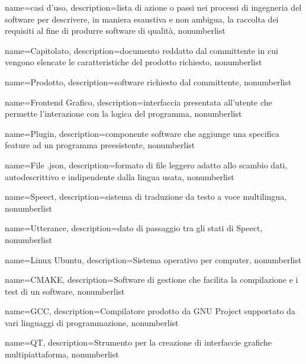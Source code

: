 {
	name={casi d'uso},
	description={lista di azione o passi nei processi di ingegneria del software per descrivere, in maniera esaustiva e non ambigua, la raccolta dei requisiti al fine di produrre software di qualità},
	nonumberlist
}


{
	name={Capitolato},
	description={documento reddatto dal committente in cui vengono elencate le caratteristiche del prodotto richiesto},
	nonumberlist
}

{
	name={Prodotto},
	description={software richiesto dal committente},
	nonumberlist
}

{
	name={Frontend Grafico},
	description={interfaccia presentata all'utente che permette l'interazione con la logica del programma},
	nonumberlist
}

{
	name={Plugin},
	description={componente software che aggiunge una specifica feature ad un programma preesistente},
	nonumberlist
}

{
	name={File .json},
	description={formato di file leggero adatto allo scambio dati, autodescrittivo e indipendente dalla lingua usata},
	nonumberlist
}

{
name={Speect},
description={sistema di traduzione da testo a voce multilingua},
nonumberlist
}

{
name={Utterance},
description={dato di passaggio tra gli stati di Speect},
nonumberlist
}



{
	name={Linux Ubuntu},
	description={Sistema operativo per computer},
	nonumberlist
}

{
	name={CMAKE},
	description={Software di gestione che facilita la compilazione e i test di un software},
	nonumberlist
}

{
	name={GCC},
	description={Compilatore prodotto da GNU Project supportato da vari linguaggi di programmazione},
	nonumberlist
}

{
	name={QT},
	description={Strumento per la creazione di interfaccie grafiche multipiattaforma},
	nonumberlist
}